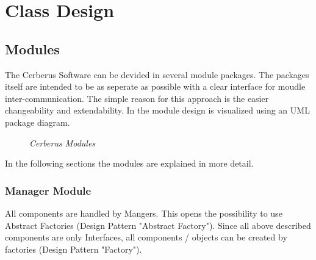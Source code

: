 \chapter{Class Design}

\section{Modules}

The Cerberus Software can be devided in several module packages.
The packages itself are intended to be as seperate as possible with a clear interface for moudle inter-communication. 
The simple reason for this approach is the easier changeability and extendability.
In  the module design is visualized using an UML package diagram.

\begin{figure}[ht]
\centering
{} 
\caption[Cerberus Module Design]{\textit{Cerberus Modules}} 
\label{gfx:cerberus_module_design}
\end{figure}

In the following sections the modules are explained in more detail.

\subsection{Manager Module}

All components are handled by Mangers. This opens the possibility to use Abstract Factories (Design Pattern "Abstract  Factory"). Since all above described components are only Interfaces, all components / objects can be created by factories (Design Pattern "Factory").

